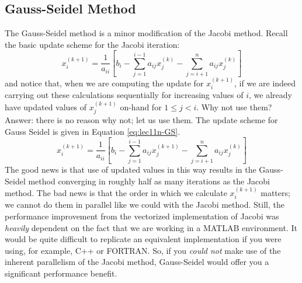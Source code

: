 \subsection{Gauss-Seidel Method}
The Gauss-Seidel method is a minor modification of the Jacobi method.  Recall the basic update scheme for the Jacobi iteration:
\begin{equation*}
x_i^{(k+1)} = \frac{1}{a_{ii}}\left[b_{i} - \sum\limits_{j=1}^{i-1}a_{ij}x_{j}^{(k)} - \sum\limits_{j=i+1}^{n}a_{ij}x_j^{(k)} \right]
\end{equation*}
and notice that, when we are computing the update for $x_i^{(k+1)}$, if we are indeed carrying out these calculations sequentially for increasing values of $i$, we already have updated values of $x^{(k+1)}_j$ on-hand for $1 \le j < i$.  Why not use them?  Answer: there is no reason why not; let us use them.  The update scheme for Gauss Seidel is given in Equation \ref{eq:lec11n-GS}.
\begin{equation}
x_i^{(k+1)} = \frac{1}{a_{ii}}\left[b_{i} - \sum\limits_{j=1}^{i-1}a_{ij}x_{j}^{(k+1)} - \sum\limits_{j=i+1}^{n}a_{ij}x_j^{(k)} \right]
\label{eq:lec11n-GS}
\end{equation}
The good news is that use of updated values in this way results in the Gauss-Seidel method converging in roughly half as many iterations as the Jacobi method.  The bad news is that the order in which we calculate $x_{i}^{(k+1)}$ matters; we cannot do them in parallel like we could with the Jacobi method.  Still, the performance improvement from the vectorized implementation of Jacobi was \emph{heavily} dependent on the fact that we are working in a MATLAB environment.  It would be quite difficult to replicate an equivalent implementation if you were using, for example, C++ or FORTRAN.  So, if you \emph{could not} make use of the inherent parallelism of the Jacobi method, Gauss-Seidel would offer you a significant performance benefit.  

